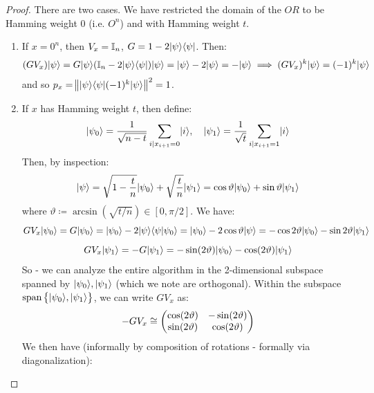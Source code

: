 \begin{proof}
    There are two cases. We have restricted the domain of the $OR$ to be Hamming weight $0$ (i.e. $O^n$) and with Hamming weight $t$.
    \begin{enumerate}
        \item If $x = 0^n$, then $V_x = \mathbb{I}_n$, $G = 1 - 2\lvert \psi \rangle \langle \psi \rvert$. Then:
        \begin{equation}
            (GV_x)\lvert \psi \rangle = G\lvert \psi \rangle (\mathbb{I}_n - 2\lvert \psi \rangle \langle \psi \rvert)\lvert \psi \rangle = \lvert \psi \rangle - 2\lvert \psi \rangle = -\lvert \psi \rangle \implies (GV_x)^k\lvert \psi \rangle = (-1)^k\lvert \psi \rangle
        \end{equation}
        and so $p_x = \norm{\lvert \psi \rangle \langle \psi \rvert(-1)^k\lvert \psi \rangle}^2 = 1$. 
        \item If $x$ has Hamming weight $t$, then define:
        \begin{equation}
            \lvert \psi_0 \rangle = \frac{1}{\sqrt{n-t}}\sum_{i\vert x_{i+1} = 0}\lvert i \rangle, \quad  \lvert \psi_1 \rangle = \frac{1}{\sqrt{t}}\sum_{i\vert x_{i+1} = 1}\lvert i \rangle
        \end{equation}
        Then, by inspection:
        \begin{equation}
            \lvert \psi \rangle = \sqrt{1-\frac{t}{n}}\lvert \psi_0 \rangle + \sqrt{\frac{t}{n}}\lvert \psi_1 \rangle = \cos\vartheta\lvert \psi_0 \rangle + \sin\vartheta\lvert \psi_1 \rangle
        \end{equation}
        where $\vartheta \coloneqq \arcsin(\sqrt{t/n}) \in [0,\pi/2]$. We have:
        \begin{equation}
            GV_x\lvert \psi_0 \rangle = G\lvert \psi_0 \rangle = \lvert \psi_0 \rangle - 2\lvert \psi \rangle\langle \psi \lvert \psi_0 \rangle = \lvert \psi_0 \rangle - 2\cos\vartheta\lvert \psi \rangle = -\cos2\vartheta\lvert \psi_0 \rangle - \sin2\vartheta\lvert \psi_1 \rangle
        \end{equation}
        \begin{equation}
            GV_x\lvert \psi_1 \rangle = -G\lvert \psi_1 \rangle = -\sin(2\vartheta)\lvert \psi_0 \rangle -\cos(2\vartheta)\lvert \psi_1 \rangle
        \end{equation}
        So - we can analyze the entire algorithm in the 2-dimensional subspace spanned by $\lvert \psi_0 \rangle, \lvert \psi_1 \rangle$ (which we note are orthogonal). Within the subspace $\text{span}\set{\lvert \psi_0 \rangle, \lvert \psi_1 \rangle}$, we can write $GV_x$ as:
        \begin{equation}
            -GV_x \cong \begin{pmatrix}\cos(2\vartheta) & -\sin(2\vartheta) \\ \sin(2\vartheta) & \cos(2\vartheta)\end{pmatrix}
        \end{equation}
        We then have (informally by composition of rotations - formally via diagonalization):

\end{enumerate}
\end{proof}
